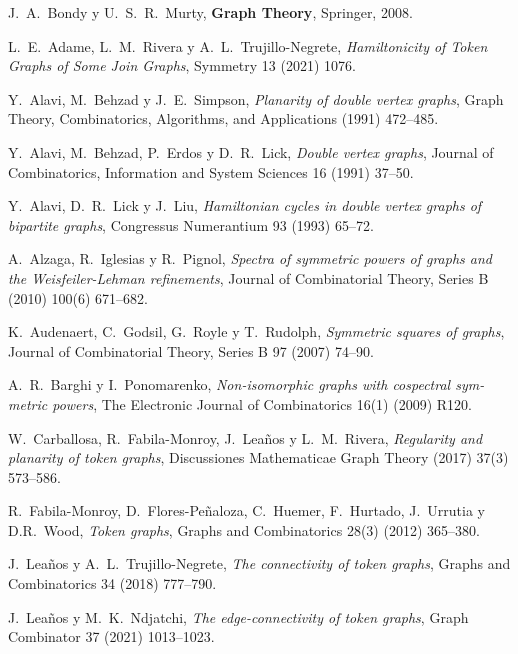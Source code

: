 \begin{thebibliography}{99}

  J.~A.~Bondy y U.~S.~R.~Murty,
  \textbf{Graph Theory},
  Springer, 2008.

  L.~E.~Adame, L.~M.~Rivera y A.~L.~Trujillo-Negrete,
  \textit{Hamiltonicity of Token Graphs of Some Join Graphs},
  Symmetry 13 (2021) 1076. 

  Y.~Alavi, M.~Behzad y J.~E.~Simpson,
  \textit{Planarity of double vertex graphs},
  Graph Theory, Combinatorics, Algorithms, and Applications (1991) 472--485.

 Y.~Alavi, M.~Behzad, P.~Erdos y D.~R.~Lick,
 \textit{Double vertex graphs},
 Journal of Combinatorics, Information and System Sciences 16 (1991) 37--50.

 Y.~Alavi, D.~R.~Lick y J.~Liu,
 \textit{Hamiltonian cycles in double vertex graphs of bipartite graphs},
 Congressus Numerantium 93 (1993) 65--72.

  A.~Alzaga, R.~Iglesias y  R.~Pignol,
  \textit{Spectra of symmetric powers of graphs and
  the Weisfeiler-Lehman refinements},
  Journal of Combinatorial Theory, Series B (2010) 100(6) 671--682. 

  K.~Audenaert, C.~Godsil, G.~Royle y T.~Rudolph,
  \textit{Symmetric squares of graphs},
  Journal of Combinatorial Theory, Series B 97 (2007) 74--90. 

  A.~R.~Barghi y I.~Ponomarenko,
  \textit{Non-isomorphic graphs with cospectral sym-
  metric powers},
  The Electronic Journal of Combinatorics 16(1) (2009) R120.

  W.~Carballosa, R.~Fabila-Monroy, J.~Lea\~{n}os y L.~M.~Rivera,
  \textit{Regularity and
  planarity of token graphs},
  Discussiones Mathematicae Graph Theory (2017) 37(3) 573--586. 

  R.~Fabila-Monroy, D.~Flores-Pe\~{n}aloza, C.~Huemer, F.~Hurtado, J.~Urrutia y
D.R.~Wood,
  \textit{Token graphs},
  Graphs and Combinatorics 28(3) (2012) 365--380. 

  J.~Lea\~{n}os y A.~L.~Trujillo-Negrete,
  \textit{The connectivity of token graphs},
  Graphs and Combinatorics 34 (2018) 777--790. 

  J.~Lea\~{n}os y M.~K.~Ndjatchi,
  \textit{The edge-connectivity of token graphs},
  Graph Combinator 37 (2021) 1013--1023. 
 

\end{thebibliography}
